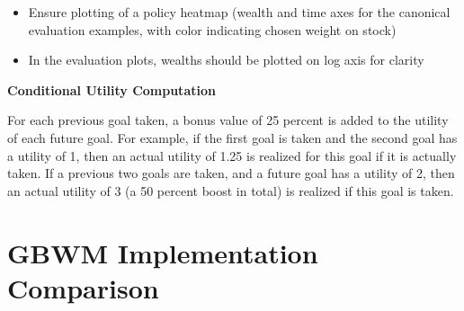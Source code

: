 \documentclass[mnsc,sglanonrev]{informs4}
\begin{document}
\begin{APPENDICES}
\begin{itemize}
\begin{enumerate}
            \item Four-goal example of T = 16 years, goal amounts of 100 dollars each, intermediate goals at 4, 8, 12 years, utilities of 1, 1, 2, and 4 respectively
        \end{enumerate}
    \item Ensure plotting of a policy heatmap (wealth and time axes for the canonical evaluation examples, with color indicating chosen weight on stock)
    \item In the evaluation plots, wealths should be plotted on log axis for clarity
\end{itemize}

\textbf{Conditional Utility Computation}

For each previous goal taken, a bonus value of 25 percent is added to the utility of each future goal. For example, if the first goal is taken and the second goal has a utility of 1, then an actual utility of 1.25 is realized for this goal if it is actually taken. If a previous two goals are taken, and a future goal has a utility of 2, then an actual utility of 3 (a 50 percent boost in total) is realized if this goal is taken.

\section{GBWM Implementation Comparison} \label{app:comparison_gbwm}


\end{APPENDICES}
\end{document}
